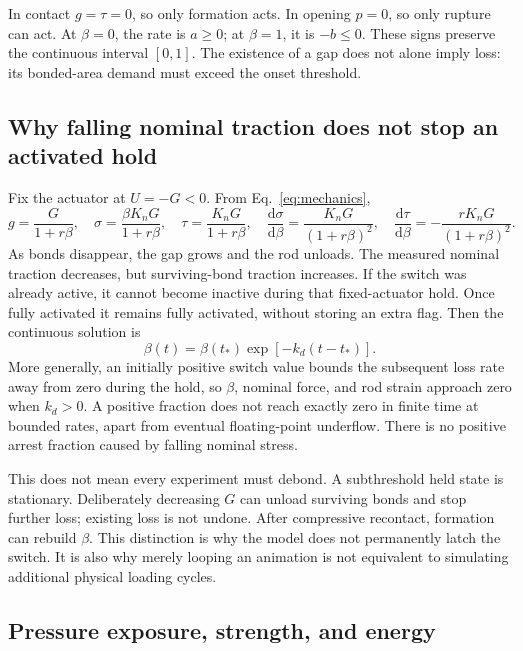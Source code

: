 \documentclass[11pt,a4paper]{article}
\newcommand{\dd}{\mathrm{d}}
\begin{document}
In contact $g=\tau=0$, so only formation acts. In opening $p=0$, so only
rupture can act. At $\beta=0$, the rate is $a\geq0$; at $\beta=1$, it is
$-b\leq0$. These signs preserve the continuous interval $[0,1]$.
The existence of a gap does not alone imply loss: its bonded-area demand must
exceed the onset threshold.

\subsection{Why falling nominal traction does not stop an activated hold}

Fix the actuator at $U=-G<0$. From Eq.~\eqref{eq:mechanics},
\begin{equation}
 g=\frac{G}{1+r\beta},\quad
 \sigma=\frac{\beta K_nG}{1+r\beta},\quad
 \tau=\frac{K_nG}{1+r\beta},\quad
 \frac{\dd\sigma}{\dd\beta}=\frac{K_nG}{(1+r\beta)^2},\quad
 \frac{\dd\tau}{\dd\beta}=-\frac{rK_nG}{(1+r\beta)^2}.
 \label{eq:feedback}
\end{equation}
As bonds disappear, the gap grows and the rod unloads. The measured nominal
traction decreases, but surviving-bond traction increases. If the switch was
already active, it cannot become inactive during that fixed-actuator hold.
Once fully activated it remains fully activated, without storing an extra flag.
Then the continuous solution is
\begin{equation}
 \beta(t)=\beta(t_*)\exp[-k_d(t-t_*)].
 \label{eq:exponential}
\end{equation}
More generally, an initially positive switch value bounds the subsequent loss
rate away from zero during the hold, so $\beta$, nominal force, and rod strain
approach zero when $k_d>0$. A positive fraction does not reach exactly zero in
finite time at bounded rates, apart from eventual floating-point underflow.
There is no positive arrest fraction caused by falling nominal stress.

This does not mean every experiment must debond. A subthreshold held state is
stationary. Deliberately decreasing $G$ can unload surviving bonds and stop
further loss; existing loss is not undone. After compressive recontact,
formation can rebuild $\beta$. This distinction is why the model does not
permanently latch the switch. It is also why merely looping an animation is
not equivalent to simulating additional physical loading cycles.

\subsection{Pressure exposure, strength, and energy}
\end{document}
